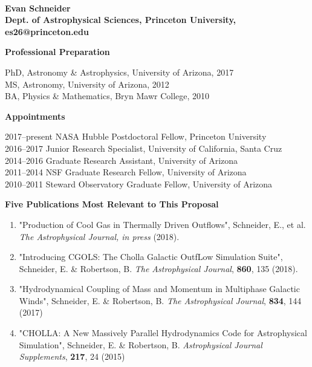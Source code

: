 \documentclass[11pt,letterpaper,english]{article}
\begin{document}
\setlength{\parindent}{0in} %

\pagestyle{fancy}   \renewcommand{%
\headrulewidth}{0.0pt}



\\
{\bf Evan Schneider}\\
{\bf Dept. of Astrophysical Sciences, Princeton University, es26@princeton.edu} \smallskip

\begin{flushleft} {\bf Professional Preparation}
{\parindent 16pt

PhD, Astronomy \& Astrophysics, University of Arizona, 2017 \\ 
MS, Astronomy, University of Arizona, 2012 \\ 
BA, Physics \& Mathematics, Bryn Mawr College, 2010 \\ 
}

\vspace{.04in}
{\bf Appointments}
{\parindent 16pt

2017--present NASA Hubble Postdoctoral Fellow, Princeton University \\ 
2016--2017 Junior Research Specialist, University of California, Santa Cruz \\ 
2014--2016 Graduate Research Assistant, University of Arizona \\ 
2011--2014 NSF Graduate Research Fellow, University of Arizona \\ 
2010--2011 Steward Observatory Graduate Fellow, University of Arizona \\ 
}

\vspace{.04in}
{\bf Five Publications Most Relevant to This Proposal}
\vspace{-6pt}
\begin{enumerate} \itemsep1pt \parskip0pt 
\item "Production of Cool Gas in Thermally Driven Outflows", Schneider, E., et al. \textit{The Astrophysical Journal, in press} (2018).
\item "Introducing CGOLS: The Cholla Galactic OutfLow Simulation Suite", Schneider, E. \& Robertson, B. \textit{The Astrophysical Journal}, {\bf 860}, 135 (2018).
\item "Hydrodynamical Coupling of Mass and Momentum in Multiphase Galactic Winds", Schneider, E. \& Robertson, B. \textit{The Astrophysical Journal}, {\bf 834}, 144 (2017)\\ 
\item "CHOLLA: A New Massively Parallel Hydrodynamics Code for Astrophysical Simulation", Schneider, E. \& Robertson, B. \textit{Astrophysical Journal Supplements}, {\bf 217}, 24 (2015)\\ 
\end{enumerate} 


\end{flushleft}
\end{document}
